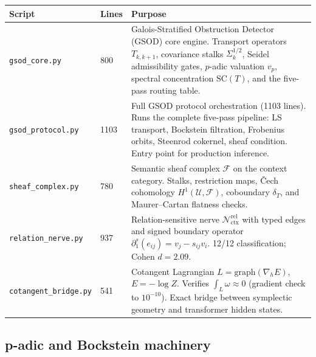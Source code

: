 \documentclass[11pt]{amsart}
\theoremstyle{definition}
\begin{document}
\begin{center}
\renewcommand{\arraystretch}{1.2}
\small
\begin{tabular}{@{}p{4.2cm}p{1.0cm}p{8.2cm}@{}}
\toprule
Script & Lines & Purpose \\
\midrule
\texttt{gsod\_core.py} & 800 &
  Galois-Stratified Obstruction Detector (GSOD) core engine.
  Transport operators $T_{k,k+1}$, covariance stalks $\Sigma_k^{1/2}$,
  Seidel admissibility gates, $p$-adic valuation $v_p$,
  spectral concentration $\mathrm{SC}(T)$, and the five-pass
  routing table. \\
\texttt{gsod\_protocol.py} & 1103 &
  Full GSOD protocol orchestration (1103 lines).
  Runs the complete five-pass pipeline: LS transport,
  Bockstein filtration, Frobenius orbits, Steenrod cokernel,
  sheaf condition. Entry point for production inference. \\
\texttt{sheaf\_complex.py} & 780 &
  Semantic sheaf complex $\mathcal{F}$ on the context category.
  Stalks, restriction maps, \v{C}ech cohomology $H^1(\mathcal{U},\mathcal{F})$,
  coboundary $\delta_T$, and Maurer--Cartan flatness checks. \\
\texttt{relation\_nerve.py} & 937 &
  Relation-sensitive nerve $\mathcal{N}_{\mathrm{ctx}}^{\mathrm{rel}}$
  with typed edges and signed boundary operator
  $\partial_1^s(e_{ij}) = v_j - s_{ij}v_i$.
  12/12 classification; Cohen $d=2.09$. \\
\texttt{cotangent\_bridge.py} & 541 &
  Cotangent Lagrangian $L = \mathrm{graph}(\nabla_h E)$,
  $E = -\log Z$.
  Verifies $\int_L \omega \approx 0$ (gradient check to $10^{-10}$).
  Exact bridge between symplectic geometry and transformer hidden states. \\
\bottomrule
\end{tabular}
\end{center}

\subsection{p-adic and Bockstein machinery}
\end{document}
